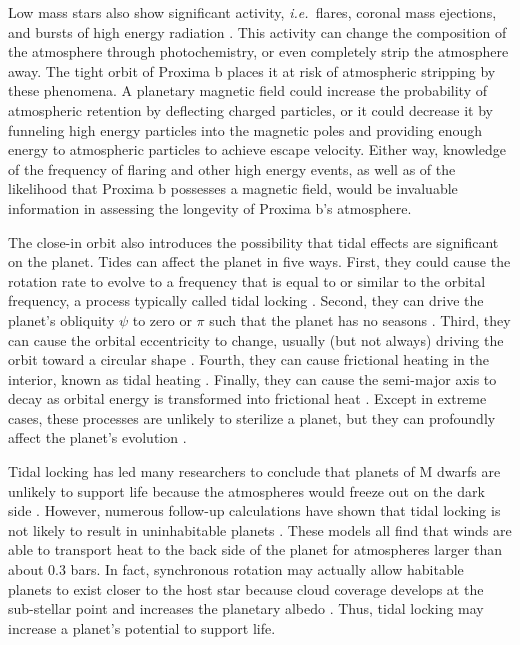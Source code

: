 \documentclass[preprint,12pt]{aastex}
\def\eg{{\it e.g.\ }}
\def\ie{{\it i.e.\ }}
\begin{document}
Low mass stars also show significant activity, \ie flares, coronal
mass ejections, and bursts of high energy radiation
\citep[\eg][]{West08}. This activity can change the composition of the
atmosphere through photochemistry, or even completely strip the
atmosphere away. The tight orbit of Proxima b places it at risk of
atmospheric stripping by these phenomena. A planetary magnetic field
could increase the probability of atmospheric retention by deflecting
charged particles, or it could decrease it by funneling high energy
particles into the magnetic poles and providing enough energy to
atmospheric particles to achieve escape velocity. Either way, knowledge of the
frequency of flaring and other high energy events, as well as of the
likelihood that Proxima b possesses a magnetic field, would be
invaluable information in assessing the longevity of Proxima b's atmosphere.

The close-in orbit also introduces the possibility that tidal effects
are significant on the planet. Tides can affect the planet in five
ways. First, they could cause the rotation rate to evolve to a
frequency that is equal to or similar to the orbital frequency, a
process typically called tidal locking
\citep{Dole64,Kasting93,Barnes16}. Second, they can drive the planet's
obliquity $\psi$ to zero or $\pi$ such that the planet has no seasons
\citep{Heller11}. Third, they can cause the orbital eccentricity to
change, usually (but not always) driving the orbit toward a circular
shape \citep{Darwin1880}. Fourth, they can cause frictional heating in
the interior, known as tidal heating
\citep{Peale79,Jackson08c,Barnes13}. Finally, they can cause the
semi-major axis to decay as orbital energy is transformed into
frictional heat \citep{Darwin1880,Barnes08}. Except in extreme cases,
these processes are unlikely to sterilize a planet, but they can
profoundly affect the planet's evolution \citep{DriscollBarnes15}.

Tidal locking has led many researchers to conclude that planets of M
dwarfs are unlikely to support life because the atmospheres would
freeze out on the dark side \citep{Kasting93}. However, numerous
follow-up calculations have shown that tidal locking is not likely to
result in uninhabitable planets
\citep{Joshi97,Pierrehumbert11,Wordsworth11,Yang13,Shields16}. These
models all find that winds are able to transport heat to the back side
of the planet for atmospheres larger than about 0.3 bars. In fact,
synchronous rotation may actually allow habitable planets to exist
closer to the host star because cloud coverage develops at the
sub-stellar point and increases the planetary albedo
\citep{Yang13}. Thus, tidal locking may increase a planet's potential
to support life.
\end{document}
